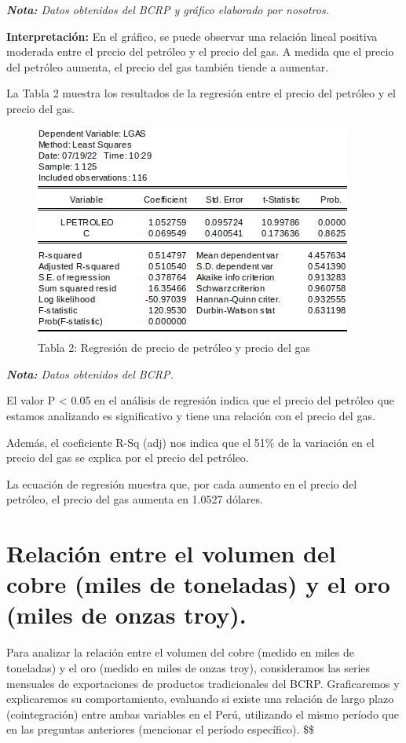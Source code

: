 \documentclass[
  letterpaper,
  DIV=11,
  numbers=noendperiod]{scrartcl}
\begin{document}
\emph{\textbf{Nota:} Datos obtenidos del BCRP y gráfico elaborado por
nosotros.}

\textbf{Interpretación:} En el gráfico, se puede observar una relación
lineal positiva moderada entre el precio del petróleo y el precio del
gas. A medida que el precio del petróleo aumenta, el precio del gas
también tiende a aumentar.

La Tabla 2 muestra los resultados de la regresión entre el precio del
petróleo y el precio del gas.

\begin{figure}

\caption{Tabla 2: Regresión de precio de petróleo y precio del gas}

{\centering \includegraphics{20230603100307.png}

}

\end{figure}

\emph{\textbf{Nota:} Datos obtenidos del BCRP.}

El valor P \textless{} 0.05 en el análisis de regresión indica que el
precio del petróleo que estamos analizando es significativo y tiene una
relación con el precio del gas.

Además, el coeficiente R-Sq (adj) nos indica que el 51\% de la variación
en el precio del gas se explica por el precio del petróleo.

La ecuación de regresión muestra que, por cada aumento en el precio del
petróleo, el precio del gas aumenta en 1.0527 dólares.

\hypertarget{relaciuxf3n-entre-el-volumen-del-cobre-miles-de-toneladas-y-el-oro-miles-de-onzas-troy.}{%
\section{Relación entre el volumen del cobre (miles de toneladas) y el
oro (miles de onzas
troy).}\label{relaciuxf3n-entre-el-volumen-del-cobre-miles-de-toneladas-y-el-oro-miles-de-onzas-troy.}}

Para analizar la relación entre el volumen del cobre (medido en miles de
toneladas) y el oro (medido en miles de onzas troy), consideramos las
series mensuales de exportaciones de productos tradicionales del BCRP.
Graficaremos y explicaremos su comportamiento, evaluando si existe una
relación de largo plazo (cointegración) entre ambas variables en el
Perú, utilizando el mismo período que en las preguntas anteriores
(mencionar el período específico). \$\$


\printbibliography
\end{document}
